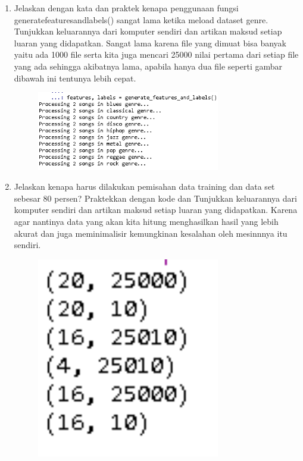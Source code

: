\begin{enumerate}
\begin{figure}[H]
	\end{figure}
	\item Jelaskan dengan kata dan praktek kenapa penggunaan fungsi generatefeaturesandlabels() sangat lama ketika meload dataset  genre. Tunjukkan keluarannya dari komputer sendiri dan artikan maksud setiap luaran yang didapatkan.
	\hfill\break
	Sangat lama karena file yang dimuat bisa banyak yaitu ada 1000 file serta kita juga mencari 25000 nilai pertama dari setiap file yang ada sehingga akibatnya lama, apabila hanya dua file seperti gambar dibawah ini tentunya lebih cepat.
	\hfill\break
	\begin{figure}[H]
		\includegraphics[width=8cm]{figures/1174079/6/4.png}
		\centering
	\end{figure}
	\item Jelaskan kenapa harus dilakukan pemisahan data training dan data set sebesar 80 persen? Praktekkan dengan kode dan Tunjukkan keluarannya dari komputer sendiri dan artikan maksud setiap luaran yang didapatkan.
	\hfill\break
	Karena agar nantinya data yang akan kita hitung menghasilkan hasil yang lebih akurat dan juga meminimalisir kemungkinan kesalahan oleh mesinnnya itu sendiri.
	
	\hfill\break
	\begin{figure}[H]
		\includegraphics[width=8cm]{figures/1174079/6/6.PNG}
		\centering

\end{figure}
\end{enumerate}
